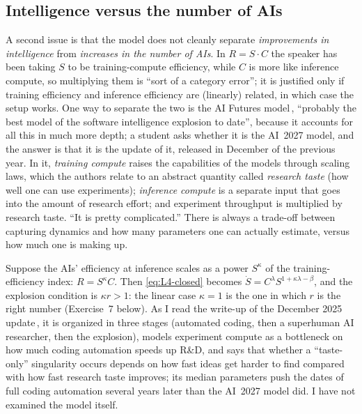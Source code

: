\subsection{Intelligence versus the number of AIs}\label{sec:L4-two}
A second issue is that the model does not cleanly separate \emph{improvements in intelligence} from \emph{increases in the number of AIs}. In $R=S\cdot C$ the speaker has been taking $S$ to be training-compute efficiency, while $C$ is more like inference compute, so multiplying them is ``sort of a category error''; it is justified only if training efficiency and inference efficiency are (linearly) related, in which case the setup works.
One way to separate the two is the AI Futures model\,\citep{aifutures2025dec}, ``probably the best model of the software intelligence explosion to date'', because it accounts for all this in much more depth; a student asks whether it is the AI~2027 model, and the answer is that it is the update of it, released in December of the previous year. In it, \emph{training compute} raises the capabilities of the models through scaling laws, which the authors relate to an abstract quantity called \emph{research taste} (how well one can use experiments); \emph{inference compute} is a separate input that goes into the amount of research effort; and experiment throughput is multiplied by research taste. ``It is pretty complicated.'' There is always a trade-off between capturing dynamics and how many parameters one can actually estimate, versus how much one is making up.

\begin{beyond}
Suppose the AIs' efficiency at inference scales as a power $S^{\kappa}$ of the training-efficiency index: $R=S^{\kappa}C$. Then \eqref{eq:L4-closed} becomes $\dot S=C^\lambda S^{1+\kappa\lambda-\beta}$, and the explosion condition is $\kappa r>1$: the linear case $\kappa=1$ is the one in which $r$ is the right number (Exercise~7 below). As I read the write-up of the December 2025 update\,\citep{aifutures2025dec}, it is organized in three stages (automated coding, then a superhuman AI researcher, then the explosion), models experiment compute as a bottleneck on how much coding automation speeds up R\&D, and says that whether a ``taste-only'' singularity occurs depends on how fast ideas get harder to find compared with how fast research taste improves; its median parameters push the dates of full coding automation several years later than the AI~2027 model did. I have not examined the model itself.
\end{beyond}

